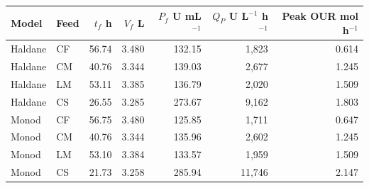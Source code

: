 \begin{tabular}{@{}llrrrrr@{}}\toprule
Model & Feed & \shortstack{$t_f$\\h} & \shortstack{$V_f$\\L} & \shortstack{$P_f$\\U mL$^{-1}$} & \shortstack{$Q_P$\\U L$^{-1}$ h$^{-1}$} & \shortstack{Peak OUR\\mol h$^{-1}$}\\\midrule
Haldane & CF & 56.74 & 3.480 & 132.15 & 1,823 & 0.614 \\
Haldane & CM & 40.76 & 3.344 & 139.03 & 2,677 & 1.245 \\
Haldane & LM & 53.11 & 3.385 & 136.79 & 2,020 & 1.509 \\
Haldane & CS & 26.55 & 3.285 & 273.67 & 9,162 & 1.803 \\
Monod & CF & 56.75 & 3.480 & 125.85 & 1,711 & 0.647 \\
Monod & CM & 40.76 & 3.344 & 135.96 & 2,602 & 1.245 \\
Monod & LM & 53.10 & 3.384 & 133.57 & 1,959 & 1.509 \\
Monod & CS & 21.73 & 3.258 & 285.94 & 11,746 & 2.147 \\
\bottomrule\end{tabular}
